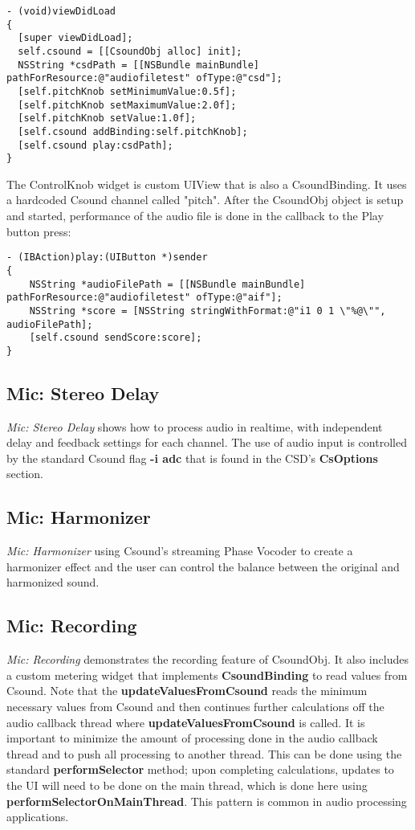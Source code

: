 \documentclass[11pt]{article}
\begin{document}
\begin{lstlisting}[caption=CsoundObj setup code]
- (void)viewDidLoad
{
  [super viewDidLoad];
  self.csound = [[CsoundObj alloc] init];
  NSString *csdPath = [[NSBundle mainBundle] pathForResource:@"audiofiletest" ofType:@"csd"];
  [self.pitchKnob setMinimumValue:0.5f];
  [self.pitchKnob setMaximumValue:2.0f];
  [self.pitchKnob setValue:1.0f];
  [self.csound addBinding:self.pitchKnob];
  [self.csound play:csdPath];
}
\end{lstlisting}

The ControlKnob widget is custom UIView that is also a CsoundBinding.  It uses a hardcoded Csound channel called "pitch".  After the CsoundObj object is setup and started, performance of the audio file is done in the callback to the Play button press:

\begin{lstlisting}[caption=Play button callback code]
- (IBAction)play:(UIButton *)sender
{
    NSString *audioFilePath = [[NSBundle mainBundle] pathForResource:@"audiofiletest" ofType:@"aif"];
    NSString *score = [NSString stringWithFormat:@"i1 0 1 \"%@\"", audioFilePath];
    [self.csound sendScore:score];
}
\end{lstlisting}

\subsection{Mic: Stereo Delay}

\emph{Mic: Stereo Delay} shows how to process audio in realtime, with independent delay and feedback settings for each channel. The use of audio input is controlled by the standard Csound flag \textbf{-i adc} that is found in the CSD's \textbf{CsOptions} section.

\subsection{Mic: Harmonizer}

\emph{Mic: Harmonizer} using Csound's streaming Phase Vocoder to create a harmonizer effect and the user can control the balance between the original and harmonized sound.

\subsection{Mic: Recording}

\emph{Mic: Recording} demonstrates the recording feature of CsoundObj.  It also includes a custom metering widget that implements \textbf{CsoundBinding} to read values from Csound.  Note that the \textbf{updateValuesFromCsound} reads the minimum necessary values from Csound and then continues further calculations off the audio callback thread where \textbf{updateValuesFromCsound} is called.  It is important to minimize the amount of processing done in the audio callback thread and to push all processing to another thread.  This can be done using the standard \textbf{performSelector} method; upon completing calculations, updates to the UI will need to be done on the main thread, which is done here using \textbf{performSelectorOnMainThread}.  This pattern is common in audio processing applications.
\end{document}
